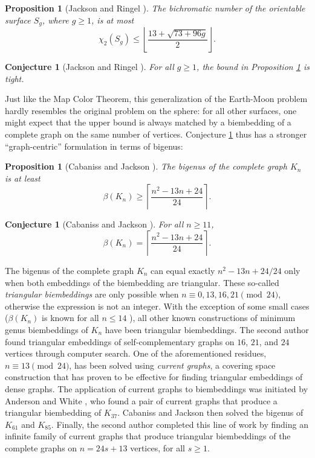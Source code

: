 \documentclass[12pt]{article}
\theoremstyle{plain}
\newtheorem{conjecture}[theorem]{Conjecture}
\newtheorem{proposition}[theorem]{Proposition}
\begin{document}
\begin{proposition}[Jackson and Ringel \cite{JacksonRingel-Variations}]
The bichromatic number of the orientable surface $S_g$, where $g \geq 1$, is at most
$$\chi_2(S_g) \leq \left\lfloor \frac{13+\sqrt{73+96g}}{2} \right\rfloor.$$
\label{prop-color}
\end{proposition}

\begin{conjecture}[Jackson and Ringel \cite{JacksonRingel-Variations}]
For all $g \geq 1$, the bound in Proposition \ref{prop-color} is tight.
\label{conj-upper}
\end{conjecture}

Just like the Map Color Theorem, this generalization of the Earth-Moon problem hardly resembles the original problem on the sphere: for all other surfaces, one might expect that the upper bound is always matched by a biembedding of a complete graph on the same number of vertices. Conjecture \ref{conj-upper} thus has a stronger ``graph-centric'' formulation in terms of bigenus:

\begin{proposition}[Cabaniss and Jackson \cite{CabanissJackson-Biembeddings}]
The bigenus of the complete graph $K_n$ is at least
$$\beta(K_n) \geq \left\lceil \frac{n^2-13n+24}{24} \right \rceil.$$
\label{prop-genus}
\end{proposition}

\begin{conjecture}[Cabaniss and Jackson \cite{CabanissJackson-Biembeddings}]
For all $n \geq 11$, $$\beta(K_n) = \left\lceil \frac{n^2-13n+24}{24} \right \rceil.$$
\label{conj-lower}
\end{conjecture}

The bigenus of the complete graph $K_n$ can equal exactly $n^2-13n+24/24$ only when both embeddings of the biembedding are triangular. These so-called \emph{triangular biembeddings} are only possible when $n \equiv 0, 13, 16, 21 \pmod{24}$, otherwise the expression is not an integer. With the exception of some small cases ($\beta(K_n)$ is known for all $n \leq 14$ \cite{Ringel-Farbungsprobleme, BattleHararyKodama, Tutte-K9, Ringel-Toroidal, Beineke-TwoTorus}), all other known constructions of minimum genus biembeddings of $K_n$ have been triangular biembeddings. The second author \cite{Sun-Bigenus} found triangular embeddings of self-complementary graphs on $16$, $21$, and $24$ vertices through computer search. One of the aforementioned residues, $n \equiv 13 \pmod{24}$, has been solved using \emph{current graphs}, a covering space construction that has proven to be effective for finding triangular embeddings of dense graphs. The application of current graphs to biembeddings was initiated by Anderson and White \cite{AndersonWhite}, who found a pair of current graphs that produce a triangular biembedding of $K_{37}$. Cabaniss and Jackson \cite{CabanissJackson-Biembeddings} then solved the bigenus of $K_{61}$ and $K_{85}$. Finally, the second author \cite{Sun-Bigenus} completed this line of work by finding an infinite family of current graphs that produce triangular biembeddings of the complete graphs on $n = 24s+13$ vertices, for all $s \geq 1$. 
\end{document}
